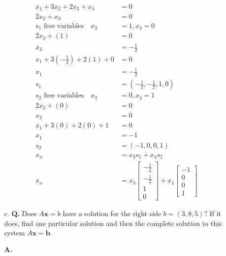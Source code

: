\documentclass[main.tex]{subfiles}
\begin{document}
\begin{enumerate}
\begin{enumerate}
    $$
    \begin{aligned}
    x_1 + 3x_2 + 2x_3 + x_4 &= 0 \\
    2x_2 + x_3 &= 0 \\
    s_1 \text{ free variables} \quad x_3 &= 1, x_4 = 0\\
    2x_2 + (1) &= 0 \\
    x_2 &= -\frac{1}{2} \\
    x_1 + 3(-\frac{1}{2}) + 2(1) + 0 &= 0 \\
    x_1 &= -\frac{1}{2} \\
    s_1 &= (-\frac{1}{2},-\frac{1}{2},1,0)\\
    s_2 \text{ free variables} \quad x_3 &= 0, x_4 = 1\\
    2x_2 + (0) &= 0 \\
    x_2 &= 0 \\
    x_1 + 3(0) + 2(0) + 1 &= 0 \\
    x_1 &= -1 \\
    s_2 &= (-1,0,0,1)\\
    x_n & = x_3s_1 + x_4s_2 \\
    x_n&=x_3\left[\begin{array}{c}
    -\frac{1}{2} \\
    -\frac{1}{2} \\
    1 \\
    0
    \end{array}\right]+x_4\left[\begin{array}{c}
    -1 \\
    0 \\
    0 \\
    1
    \end{array}\right]
    \end{aligned}
    $$
    
    \item[c.] \textbf{Q.}  Does $A \boldsymbol{x}=b$ have a solution for the right side $b=(3,8,5) ?$ If it does, find one particular solution and then the complete solution to this system $A \boldsymbol{x}=\boldsymbol{b}$. 
    
    \textbf{A.}
    

\end{enumerate}
\end{enumerate}
\end{document}
